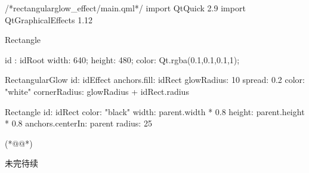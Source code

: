\label{f000074}    %
\FloatBarrier                                  %
\begin{thebookfilesourceone}[escapeinside={(*@}{@*)},
caption=GoodLuck,
title=\filesourcenumbernameone \thefilesourcenumber
]
/*rectangularglow_effect/main.qml*/
import QtQuick 2.9
import QtGraphicalEffects 1.12

Rectangle {
    id : idRoot
    width: 640;
    height: 480;
    color: Qt.rgba(0.1,0.1,0.1,1);

    RectangularGlow {
        id: idEffect
        anchors.fill: idRect
        glowRadius: 10
        spread: 0.2
        color: "white"
        cornerRadius: glowRadius + idRect.radius
    }

    Rectangle {
        id: idRect
        color: "black"
        width: parent.width * 0.8
        height: parent.height * 0.8
        anchors.centerIn: parent
        radius: 25
    }

}(*@\marginpar[\hfill\setlength\fboxsep{2pt}\fbox{\footnotesize{\kaishu\parbox{1em}{\setlength{\baselineskip}{2pt}\filesourcenumbernameone}}\footnotesize{\thefilesourcenumber}}]{\setlength\fboxsep{2pt}\fbox{\footnotesize{\kaishu\parbox{1em}{\setlength{\baselineskip}{2pt}\filesourcenumbernameone}}\footnotesize{\thefilesourcenumber}}}@*)\end{thebookfilesourceone}          %
\addtocounter{lstlisting}{-1}   %


未完待续









